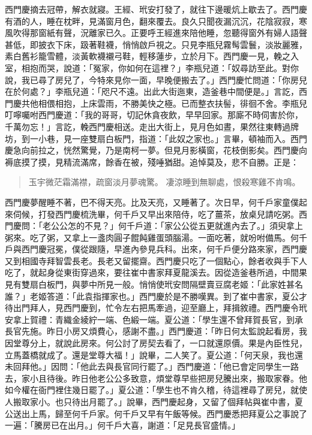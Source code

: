 西門慶摘去冠帶，解衣就寢。王經、玳安打發了，就往下邊暖炕上歇去了。西門慶有酒的人，睡在枕畔，見滿窗月色，翻來覆去。良久只聞夜漏沉沉，花陰寂寂，寒風吹得那窗紙有聲，況離家已久。正要呼王經進來陪他睡，忽聽得窗外有婦人語聲甚低，即披衣下床，趿著鞋襪，悄悄啟戶視之。只見李瓶兒霧髩雲鬟，淡妝麗雅，素白舊衫籠雪體，淡黃軟襪襯弓鞋，輕移蓮步，立於月下。西門慶一見，輓之入室，相抱而哭，說道：「冤家，你如何在這裡？」李瓶兒道：「奴尋訪至此。對你說，我已尋了房兒了，今特來見你一面，早晚便搬去了。」西門慶忙問道：「你房兒在於何處？」李瓶兒道：「咫尺不遠。出此大街迤東，造釜巷中間便是。」言訖，西門慶共他相偎相抱，上床雲雨，不勝美快之極。已而整衣扶髻，徘徊不舍。李瓶兒叮嚀囑咐西門慶道：「我的哥哥，切記休貪夜飲，早早回家。那廝不時伺害於你，千萬勿忘！」言訖，輓西門慶相送。走出大街上，見月色如晝，果然往東轉過牌坊，到一小巷，見一座雙扇白板門，指道：「此奴之家也。」言畢，頓袖而入。西門慶急向前拉之，恍然驚覺，乃是南柯一夢。但見月影橫窗，花枝倒影矣。西門慶向褥底摸了摸，見精流滿席，餘香在被，殘唾猶甜。追悼莫及，悲不自勝。正是：
\begin{quote}
玉宇微茫霜滿襟，疏窗淡月夢魂驚。
凄涼睡到無聊處，恨殺寒雞不肯鳴。
\end{quote}

西門慶夢醒睡不著，巴不得天亮。比及天亮，又睡著了。次日早，何千戶家童僕起來伺候，打發西門慶梳洗畢，何千戶又早出來陪侍，吃了薑茶，放桌兒請吃粥。西門慶問：「老公公怎的不見？」何千戶道：「家公公從五更就進內去了。」須臾拿上粥來。吃了粥，又拿上一盞肉圓子餛飩雞蛋頭腦湯。一面吃著，就吩咐備馬。何千戶與西門慶冠冕，僕從跟隨，早進內參見兵科。出來，何千戶便分路來家，西門慶又到相國寺拜智雲長老。長老又留擺齋。西門慶只吃了一個點心，餘者收與手下人吃了，就起身從東街穿過來，要往崔中書家拜夏龍溪去。因從造釜巷所過，中間果見有雙扇白板門，與夢中所見一般。悄悄使玳安問隔壁賣豆腐老姬：「此家姓甚名誰？」老姬答道：「此袁指揮家也。」西門慶於是不勝嘆異。到了崔中書家，夏公才待出門拜人，見西門慶到，忙令左右把馬牽過，迎至廳上，拜揖敘禮。西門慶令玳安拿上賀禮：青織金綾紵一端、色緞一端。夏公道：「學生還不曾拜賀長官，到承長官先施。昨日小房又煩費心，感謝不盡。」西門慶道：「昨日何太監說起看房，我因堂尊分上，就說此房來。何公討了房契去看了，一口就還原價。果是內臣性兒，立馬蓋橋就成了。還是堂尊大福！」說畢，二人笑了。夏公道：「何天泉，我也還未回拜他。」因問：「他此去與長官同行罷了。」西門慶道：「他已會定同學生一路去，家小且待後。昨日他老公公多致意，煩堂尊早些把房兒騰出來，搬取家眷。他如今權在衙門裡住幾日罷了。」夏公道：「學生也不肯久稽，待這裡尋了房兒，就使人搬取家小。也只待出月罷了。」說畢，西門慶起身，又留了個拜帖與崔中書，夏公送出上馬，歸至何千戶家。何千戶又早有午飯等候。西門慶悉把拜夏公之事說了一遍：「騰房已在出月。」何千戶大喜，謝道：「足見長官盛情。」

